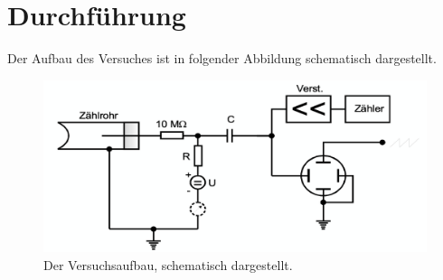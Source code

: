 \section{Durchführung}
  Der Aufbau des Versuches ist in folgender Abbildung schematisch dargestellt.
  \begin{figure}[H]
    \centering
      \includegraphics[scale=0.6]{content/AufbauV703.png}
      \caption{Der Versuchsaufbau, schematisch dargestellt.}
      \label{fig:aufbau3}
  \end{figure}

\label{sec:Durchführung}
